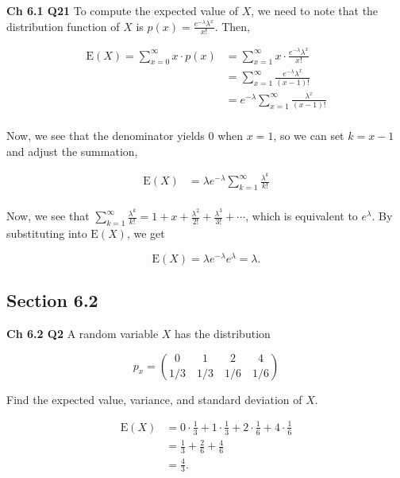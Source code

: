 \documentclass[12pt]{article}
\newcommand{\nspace}{\vspace*{.5cm}}
\newcommand{\nline}{\nspace \noindent}
\begin{document}

\nline
\textbf{Ch 6.1 Q21} To compute the expected value of $X$, we need to note that the distribution function of $X$ is $p(x) = \frac{ e^{- \lambda} \lambda^x }{x!}$. Then, 

\begin{align*}
\text{E}(X) = \sum_{x=0}^{\infty} x \cdot p(x) &= \sum_{x=1}^{\infty} x \cdot  \frac{ e^{- \lambda} \lambda^x }{x!} \\
&= \sum_{x=1}^{\infty} \frac{ e^{- \lambda} \lambda^x }{(x-1)!} \\ 
&= e^{- \lambda} \sum_{x=1}^{\infty} \frac{ \lambda^x }{(x-1)!} \\ 
\end{align*}

\nline
Now, we see that the denominator yields $0$ when $x=1$, so we can set $k=x-1$ and adjust the summation, 

\begin{align*}
\text{E}(X) &= \lambda e^{- \lambda} \sum_{k=1}^{\infty} \frac{ \lambda^k }{k!} \\ 
\end{align*}

\nline
Now, we see that $\sum_{k=1}^{\infty} \frac{ \lambda^k }{k!} = 1 + x + \frac{\lambda^2}{2!} + \frac{\lambda^3}{3!} + \cdots$, which is equivalent to $e^{\lambda}$. By substituting into $\text{E}(X)$, we get 

\begin{equation*}
\text{E}(X) = \lambda e^{- \lambda} e^{\lambda} = \lambda.
\end{equation*}

\subsection*{Section 6.2}

\nline
\textbf{Ch 6.2 Q2} A random variable $X$ has the distribution

\begin{equation*}
p_x = {0 \qquad 1 \qquad 2 \qquad 4 \choose 1/3 \quad 1/3 \quad 1/6 \quad 1/6}
\end{equation*}

\nline
Find the expected value, variance, and standard deviation of $X$.

\begin{align*}
\text{E}(X) &= 0 \cdot \frac{1}{3} + 1 \cdot \frac{1}{3} + 2 \cdot \frac{1}{6} + 4 \cdot \frac{1}{6} \\
&= \frac{1}{3} + \frac{2}{6} + \frac{4}{6} \\
&= \frac{4}{3}.
\end{align*}
\end{document}
